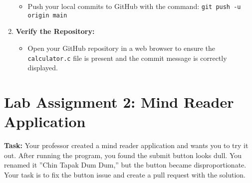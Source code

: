 \documentclass{article}
\begin{document}
\begin{enumerate}
\begin{itemize}
        \item Push your local commits to GitHub with the command: \texttt{git push -u origin main}
    \end{itemize}
    \item \textbf{Verify the Repository:}
    \begin{itemize}
        \item Open your GitHub repository in a web browser to ensure the \texttt{calculator.c} file is present and the commit message is correctly displayed.
    \end{itemize}
\end{enumerate}

\section{Lab Assignment 2: Mind Reader Application}

\textbf{Task:} Your professor created a mind reader application and wants you to try it out. After running the program, you found the submit button looks dull. You renamed it ”Chin Tapak Dum Dum,” but the button became disproportionate. Your task is to fix the button issue and create a pull request with the solution.
\end{document}
